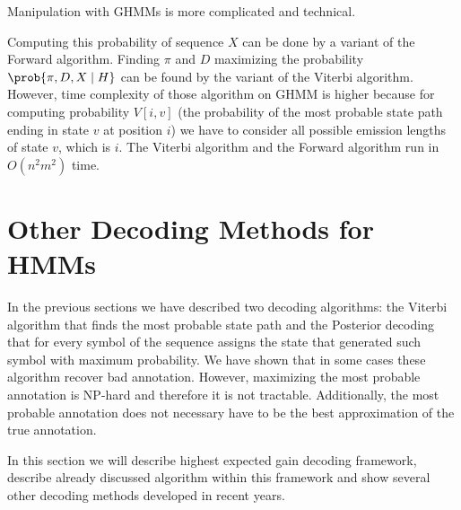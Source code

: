 Manipulation with GHMMs is  more complicated and technical.

Computing this probability of sequence $X$ can be done by a variant of the
Forward algorithm. Finding $\pi$ and $D$ maximizing the probability
$\prob{\pi,D,X\mid H}$ can be found by the variant of the Viterbi algorithm.
However, time complexity of those algorithm on GHMM is higher because for
computing probability $V[i, v]$ (the probability of the most probable state
path ending in state $v$ at position $i$) we have to consider all possible
emission lengths of state $v$, which is $i$. The Viterbi algorithm and the
Forward algorithm run in $O(n^2m^2)$ time.


\section{Other Decoding Methods for HMMs}
In the previous sections we have described two decoding algorithms: the Viterbi algorithm
that finds the most probable state path  and the Posterior decoding that for
every symbol of the sequence assigns the state that generated such symbol with
maximum probability. 
We have shown that in some cases these algorithm recover bad
annotation. However, maximizing the most probable annotation is NP-hard and
therefore it is not tractable. Additionally, the most probable annotation does
not necessary have to be the best approximation of the true annotation.

In this section we will describe highest expected gain decoding framework,
describe already discussed algorithm within this framework and show several
other decoding methods developed in recent years.

